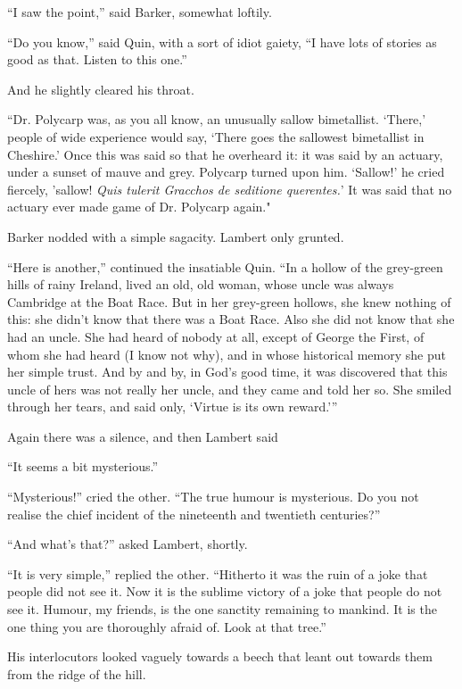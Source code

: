 \documentclass{book}
\begin{document}
“I saw the point,” said Barker, somewhat loftily.

“Do you know,” said Quin, with a sort of idiot gaiety, “I have lots of stories as good as that. Listen to this one.”

And he slightly cleared his throat.

“Dr. Polycarp was, as you all know, an unusually sallow bimetallist. ‘There,’ people of wide experience would say, ‘There goes the sallowest bimetallist in Cheshire.’ Once this was said so that he overheard it: it was said by an actuary, under a sunset of mauve and grey. Polycarp turned upon him. ‘Sallow!’ he cried fiercely, ’sallow! \emph{Quis tulerit Gracchos de seditione querentes.}' It was said that no actuary ever made game of Dr. Polycarp again."

Barker nodded with a simple sagacity. Lambert only grunted.

“Here is another,” continued the insatiable Quin. “In a hollow of the grey-green hills of rainy Ireland, lived an old, old woman, whose uncle was always Cambridge at the Boat Race. But in her grey-green hollows, she knew nothing of this: she didn’t know that there was a Boat Race. Also she did not know that she had an uncle. She had heard of nobody at all, except of George the First, of whom she had heard (I know not why), and in whose historical memory she put her simple trust. And by and by, in God’s good time, it was discovered that this uncle of hers was not really her uncle, and they came and told her so. She smiled through her tears, and said only, ‘Virtue is its own reward.’”

Again there was a silence, and then Lambert said

“It seems a bit mysterious.”

“Mysterious!” cried the other. “The true humour is mysterious. Do you not realise the chief incident of the nineteenth and twentieth centuries?”

“And what’s that?” asked Lambert, shortly.

“It is very simple,” replied the other. “Hitherto it was the ruin of a joke that people did not see it. Now it is the sublime victory of a joke that people do not see it. Humour, my friends, is the one sanctity remaining to mankind. It is the one thing you are thoroughly afraid of. Look at that tree.”

His interlocutors looked vaguely towards a beech that leant out towards them from the ridge of the hill.
\end{document}
